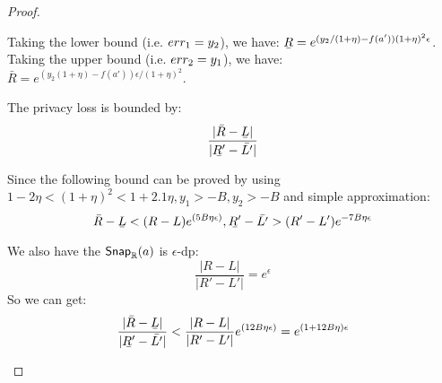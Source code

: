 \documentclass[a4paper,11pt]{article}
\begin{document}
\begin{proof}
\begin{itemize}
		Taking the lower bound (i.e. $err_1 = y_2$), we have:
		$\ubar{R} = e^{(y_2 / (1 + \eta) - f(a'))(1 + \eta)^2\epsilon}$.
		Taking the upper bound (i.e. $err_2 = y_1$), we have:
		$\bar{R} = e^{(y_2 (1 + \eta) - f(a'))\epsilon/(1 + \eta)^2}$.

		The privacy loss is bounded by:
		\[
		\frac{|\bar{R} - \ubar{L}|}{|\ubar{R'} - \bar{L'}|}
		\]

		Since the following bound can be proved by using $1 - 2\eta < (1 + \eta)^2 < 1 + 2.1\eta, y_1 > -B, y_2 > -B $ and simple approximation:
		\[
		\bar{R} - \ubar{L} < (R - L) e^{(5B\eta\epsilon)}, 
		\ubar{R'} - \bar{L'} > (R'  - L') e^{-7B\eta \epsilon}
		\]

		We also have the $\mathsf{Snap}_{\mathbb{R}}(a)$ is $\epsilon$-dp:
		\[
		\frac{|R - L|}{|R' - L'|} = e^{\epsilon}
		\]
		So we can get:
		\[
		\frac{|\bar{R} - \ubar{L}|}{|\ubar{R'} - \bar{L'}|}
		< \frac{|R - L|}{|R' - L'|} e^{(12B\eta\epsilon)}
		= e^{(1 + 12B\eta)\epsilon}
		\]		



\end{itemize}
\end{proof}
\end{document}
